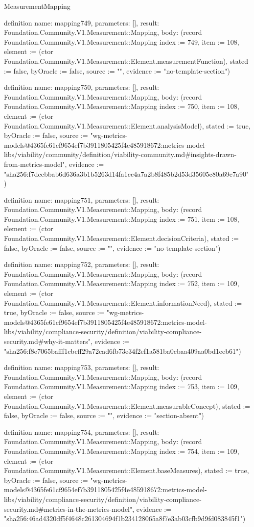 \begin{lexlean}{MeasurementMapping}
\begin{semanticmodule}
definition{
  name: mapping749,
  parameters: [],
  result: Foundation.Community.V1.Measurement::Mapping,
  body: (record Foundation.Community.V1.Measurement::Mapping {index := 749, item := 108, element := (ctor Foundation.Community.V1.Measurement::Element.measurementFunction), stated := false, byOracle := false, source := "", evidence := "no-template-section"})
}

definition{
  name: mapping750,
  parameters: [],
  result: Foundation.Community.V1.Measurement::Mapping,
  body: (record Foundation.Community.V1.Measurement::Mapping {index := 750, item := 108, element := (ctor Foundation.Community.V1.Measurement::Element.analysisModel), stated := true, byOracle := false, source := "wg-metrics-models@4365fe61cf9654ef7b3911805425f4e485918672:metrics-model-libs/viability/community/definition/viability-community.md#insights-drawn-from-metrics-model", evidence := "sha256:f7dccbbab6d636a3b1b5263d14fa1cc4a7a2b8f485b2d53d35605c80a69e7a90"})
}

definition{
  name: mapping751,
  parameters: [],
  result: Foundation.Community.V1.Measurement::Mapping,
  body: (record Foundation.Community.V1.Measurement::Mapping {index := 751, item := 108, element := (ctor Foundation.Community.V1.Measurement::Element.decisionCriteria), stated := false, byOracle := false, source := "", evidence := "no-template-section"})
}

definition{
  name: mapping752,
  parameters: [],
  result: Foundation.Community.V1.Measurement::Mapping,
  body: (record Foundation.Community.V1.Measurement::Mapping {index := 752, item := 109, element := (ctor Foundation.Community.V1.Measurement::Element.informationNeed), stated := true, byOracle := false, source := "wg-metrics-models@4365fe61cf9654ef7b3911805425f4e485918672:metrics-model-libs/viability/compliance-security/definition/viability-compliance-security.md#why-it-matters", evidence := "sha256:f8e7065bafff1cbcff29a72cad6fb73e34f2ef1a581ba0cbaa409aa0bd1eeb61"})
}

definition{
  name: mapping753,
  parameters: [],
  result: Foundation.Community.V1.Measurement::Mapping,
  body: (record Foundation.Community.V1.Measurement::Mapping {index := 753, item := 109, element := (ctor Foundation.Community.V1.Measurement::Element.measurableConcept), stated := false, byOracle := false, source := "", evidence := "section-absent"})
}

definition{
  name: mapping754,
  parameters: [],
  result: Foundation.Community.V1.Measurement::Mapping,
  body: (record Foundation.Community.V1.Measurement::Mapping {index := 754, item := 109, element := (ctor Foundation.Community.V1.Measurement::Element.baseMeasures), stated := true, byOracle := false, source := "wg-metrics-models@4365fe61cf9654ef7b3911805425f4e485918672:metrics-model-libs/viability/compliance-security/definition/viability-compliance-security.md#metrics-in-the-metrics-model", evidence := "sha256:46ad4320df5f4648c261304694f1b234128065a8f7e3ab03cfb9d9fd083845f1"})
}


\end{semanticmodule}
\end{lexlean}
